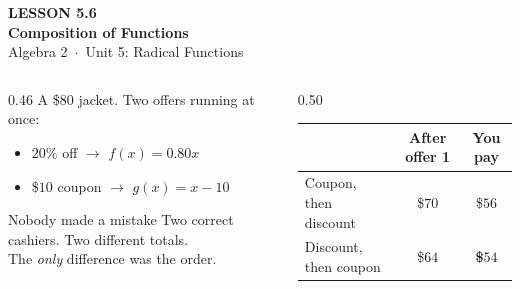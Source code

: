 \documentclass[aspectratio=169, 11pt]{beamer}
\begin{document}
{
\begin{frame}[plain]
  \vspace{2.8cm}\hspace{0.55cm}%
  \begin{minipage}{0.9\textwidth}
    {\color{goldacc}\bfseries\small LESSON 5.6}\\[0.5cm]
    {\color{white}\bfseries\LARGE Composition of Functions}\\[1.2cm]
    {\color{forestmid}\small Algebra 2~$\cdot$~Unit 5: Radical Functions}
  \end{minipage}
\end{frame}
}

\begin{frame}[t, plain]
  \begin{columns}[T]
    \begin{column}{0.46\textwidth}
      \footnotesize
      A \$$80$ jacket. Two offers running at once:
      \vspace{4pt}
      \begin{itemize}\setlength{\itemsep}{3pt}
        \item $20\%$ off \quad $\rightarrow$ \quad $f(x)=0.80x$
        \item \$$10$ coupon \quad $\rightarrow$ \quad $g(x)=x-10$
      \end{itemize}
      \vspace{6pt}
      \begin{block}{Nobody made a mistake}
        Two correct cashiers. Two different totals. \\[3pt]
        The \emph{only} difference was the order.
      \end{block}
    \end{column}
    \begin{column}{0.50\textwidth}
      \footnotesize
      \begin{center}
      \renewcommand{\arraystretch}{1.35}
      \begin{tabular}{|l|c|c|}
      \hline
      & \textbf{After offer 1} & \textbf{You pay} \\ \hline
      Coupon, then discount & \$$70$ & \$$56$ \\ \hline
      Discount, then coupon & \$$64$ & \textbf{\$$54$} \\ \hline
      \end{tabular}

\end{center}
\end{column}
\end{columns}
\end{frame}
\end{document}
